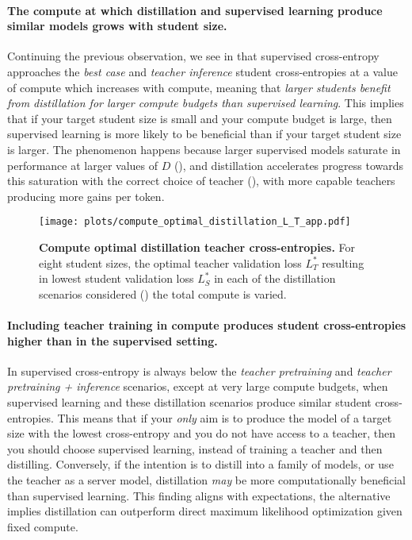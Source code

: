 \paragraph{The compute at which distillation and supervised learning produce similar models grows with student size.}
Continuing the previous observation, 
we see in 
that supervised cross-entropy approaches the
\emph{best case} and \emph{teacher inference}
student cross-entropies
at a value of compute which increases with compute,
meaning that \emph{larger students benefit from distillation for larger compute budgets than supervised learning}.
This implies that if your target student size is small and your compute budget is large,
then supervised learning is more likely to be beneficial than if your target student size is larger.
The phenomenon happens because larger supervised models saturate in performance at larger values of $D$ (),
and distillation accelerates progress towards this saturation with the correct choice of teacher
(),
with more capable teachers producing more gains per token.

\begin{figure}[h]
	\centering
	\texttt{[image: plots/compute\_optimal\_distillation\_L\_T\_app.pdf]}
    \vspace{-0.25cm}
	\caption{\textbf{Compute optimal distillation teacher cross-entropies.} For eight student sizes, the optimal teacher validation loss $L_T^*$ resulting in lowest student validation loss $L_S^*$ in each of the distillation scenarios considered () the total compute is varied.
	}
    \vspace{-0.25cm}
	\label{fig:compute-optimal-distillation-teacher-loss-app}
\end{figure}

\paragraph{Including teacher training in compute produces student cross-entropies higher than in the supervised setting.}
In 
supervised cross-entropy is always below the
\emph{teacher pretraining} and \emph{teacher pretraining + inference}
scenarios, except at very large compute budgets, when supervised learning
and these distillation scenarios produce similar student cross-entropies.
This means that if your \emph{only} aim is to produce the model of a target size with the lowest cross-entropy and you do not have access to a teacher, then you should choose supervised learning, instead of training a teacher and then distilling.
Conversely, if the intention is to distill into a family of models, or use the teacher as a server model, distillation \emph{may} be more computationally beneficial than supervised learning.
This finding aligns with expectations, the alternative implies distillation can outperform direct maximum likelihood optimization given fixed compute.

